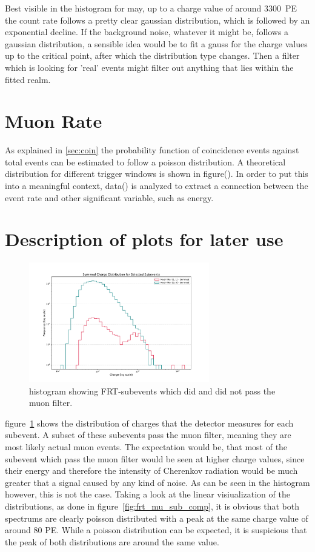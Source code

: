 Best visible in the histogram for may, up to a charge value of around \SI{3300}{PE} the count rate follows a pretty clear gaussian distribution, which is followed 
by an exponential decline. If the background noise, whatever it might be, follows a gaussian distribution, a sensible idea would be to fit a gauss for the charge 
values up to the critical point, after which the distribution type changes. Then a filter which is looking for 'real' events might filter out anything that lies 
within the fitted realm. 

\section{Muon Rate}

As explained in \ref{sec:coin} the probability function of coincidence events against total events can be estimated to follow a poisson distribution.
A theoretical distribution for different trigger windows is shown in figure(). In order to put this into a meaningful context, data() is analyzed to extract a 
connection between the event rate and other significant variable, such as energy. 

\section{Description of plots for later use}
\begin{figure}
    \centering
    \includegraphics[width=0.7\textwidth]{Plots/frt_muon_filter_sub.pdf}
    \caption{histogram showing FRT-subevents which did and did not pass the muon filter.}
    \label{fig:frt_mu_sub}
\end{figure}

figure~\ref{fig:frt_mu_sub} shows the distribution of charges that the detector measures for each subevent. A subset of these subevents pass the muon filter, 
meaning they are most likely actual muon events. The expectation would be, that most of the subevent which pass the muon filter would be seen at higher charge values,
since their energy and therefore the intensity of Cherenkov radiation would be much greater that a signal caused by any kind of noise. As can be seen in the 
histogram however, this is not the case. Taking a look at the linear visiualization of the distributions, as done in figure~\ref{fig:frt_mu_sub_comp}, it is obvious that 
both spectrums are clearly poisson distributed with a peak at the same charge value of around 80 PE. While a poisson distribution can be expected, it is 
suspicious that the peak of both distributions are around the same value. 

